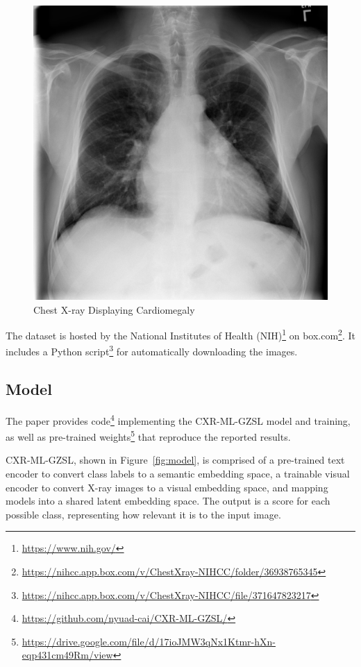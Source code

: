 \documentclass[letterpaper]{article} %
\begin{document}
\begin{figure}[h!]
\centering
\includegraphics[width=0.9\columnwidth]{cxr.png}
\caption{Chest X-ray Displaying Cardiomegaly}
\label{fig:cxr}
\end{figure}

The dataset is hosted by the National Institutes of Health (NIH)\footnote{\url{https://www.nih.gov/}} on box.com\footnote{\url{https://nihcc.app.box.com/v/ChestXray-NIHCC/folder/36938765345}}. It includes a Python script\footnote{\url{https://nihcc.app.box.com/v/ChestXray-NIHCC/file/371647823217}} for automatically downloading the images.

\subsection{Model}
\label{sec:model}

The paper provides code\footnote{\url{https://github.com/nyuad-cai/CXR-ML-GZSL/}} implementing the CXR-ML-GZSL model and training, as well as pre-trained weights\footnote{\url{https://drive.google.com/file/d/17ioJMW3qNx1Ktmr-hXn-eqp431cm49Rm/view}} that reproduce the reported results. 

CXR-ML-GZSL, shown in Figure~\ref{fig:model}, is comprised of a pre-trained text encoder to convert class labels to a semantic embedding space, a trainable visual encoder to convert X-ray images to a visual embedding space, and mapping models into a shared latent embedding space. The output is a score for each possible class, representing how relevant it is to the input image.
\end{document}
